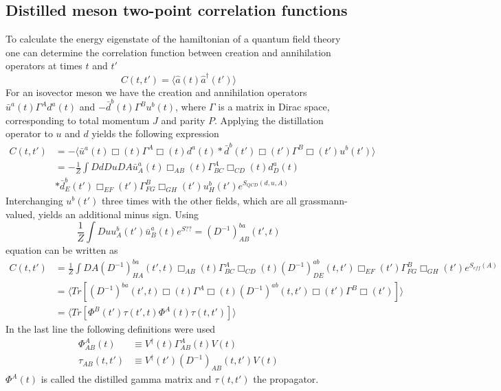 \subsection{Distilled meson two-point correlation functions}
    To calculate the energy eigenstate of the hamiltonian of a quantum field theory one can determine the correlation function between creation and annihilation operators at times $t$ and $t'$
    \begin{equation}
        C(t,t') = \langle \hat{a}(t) \hat{a}^\dagger(t')\rangle
    \end{equation}
    For an isovector meson we have the creation and annihilation operators $\bar{u}^a(t)\Gamma^Ad^a(t)$ and $-\bar{d}^b(t)\Gamma^Bu^b(t)$, where $\Gamma$ is a matrix in Dirac space, corresponding to total momentum $J$ and parity $P$.
    Applying the distillation operator to $u$ and $d$ yields the following expression
    \begin{equation}\label{distillation_correlation}
        \begin{aligned}
            C(t,t') &= -\langle \bar{u}^a(t)\Box(t)\Gamma^A\Box(t)d^a(t) * \bar{d}^b(t')\Box(t')\Gamma^B\Box(t')u^b(t') \rangle\\
            &= -\frac{1}{Z}\int Dd Du DA \bar{u}_A^a(t)\Box_{AB}(t)\Gamma_{BC}^A\Box_{CD}(t)d_D^a(t)\\ &* \bar{d}_E^b(t')\Box_{EF}(t')\Gamma_{FG}^B\Box_{GH}(t')u_H^b(t') e^{S_{QCD}(d,u,A)}
        \end{aligned}
    \end{equation}
    Interchanging $u^b(t')$ three times with the other fields, which are all grassmann-valued, yields an additional minus sign. Using
    \begin{equation}
        \frac{1}{Z}\int Du u_A^b(t')\bar{u}_B^a(t)e^{S??} = (D^{-1})_{AB}^{ba}(t',t)
    \end{equation}
    equation  can be written as
    \begin{equation}
        \begin{aligned}
            C(t,t') &= \frac{1}{Z}\int DA (D^{-1})_{HA}^{ba}(t',t) \Box_{AB}(t)\Gamma_{BC}^A\Box_{CD}(t) (D^{-1})_{DE}^{ab}(t,t') \Box_{EF}(t')\Gamma_{FG}^B\Box_{GH}(t') e^{S_{eff}(A)}\\
            &= \langle Tr[(D^{-1})^{ba}(t',t) \Box(t)\Gamma^A\Box(t) (D^{-1})^{ab}(t,t') \Box(t')\Gamma^B\Box(t')] \rangle\\
            &= \langle Tr[\Phi^B(t')\tau(t',t)\Phi^A(t)\tau(t,t')] \rangle
        \end{aligned}
    \end{equation}
    In the last line the following definitions were used
    \begin{equation}
        \begin{aligned}
            \Phi_{AB}^A(t) &\equiv V^\dagger(t)\Gamma_{AB}^A(t)V(t)\\
            \tau_{AB}(t,t') &\equiv V^\dagger(t')(D^{-1})_{AB}(t,t')V(t)
        \end{aligned}
    \end{equation}
    $\Phi^A(t)$ is called the distilled gamma matrix and $\tau(t,t')$ the propagator.
    
